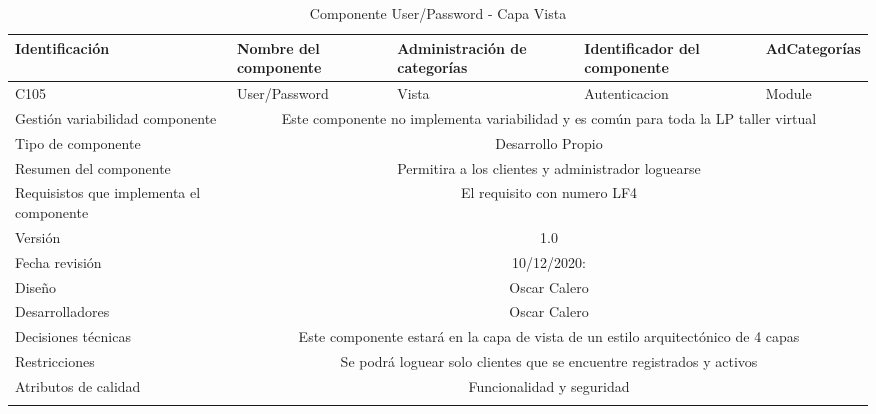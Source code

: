 \documentclass[10pt,a4paper,openany]{book}
\begin{document}
\begin{longtable}{|p{3cm}|p{3cm}|p{3cm}|p{3cm}|p{3cm}|} \hline
Identificación & Nombre del componente & Administración de categorías & Identificador del componente & AdCategorías \\[0.5ex] \hline
C105& User/Password & Vista& Autenticacion& Module\\[0.5ex] \hline
Gestión variabilidad componente & \multicolumn{4}{|c|}{Este componente no implementa variabilidad y es común para toda la LP taller virtual} \\ \hline
Tipo de componente & \multicolumn{4}{|c|}{Desarrollo Propio} \\ \hline
Resumen del componente & \multicolumn{4}{|c|}{Permitira a los clientes y administrador loguearse} \\ \hline
Requisistos que implementa el componente & \multicolumn{4}{|c|}{El requisito con numero LF4 } \\ \hline
Versión & \multicolumn{4}{|c|}{1.0 } \\ \hline
Fecha revisión & \multicolumn{4}{|c|}{ 10/12/2020:} \\ \hline
Diseño & \multicolumn{4}{|c|}{Oscar Calero} \\ \hline
Desarrolladores & \multicolumn{4}{|c|}{Oscar Calero} \\ \hline
Decisiones técnicas & \multicolumn{4}{|c|}{Este componente estará en la capa de vista de un estilo arquitectónico de 4 capas  } \\ \hline
Restricciones & \multicolumn{4}{|c|}{Se podrá loguear solo clientes que se encuentre registrados y activos} \\ \hline
Atributos de calidad & \multicolumn{4}{|c|}{Funcionalidad y seguridad} \\ \hline
\caption{Componente User/Password - Capa Vista}
\label{table:t6}
\end{longtable}
\end{document}
